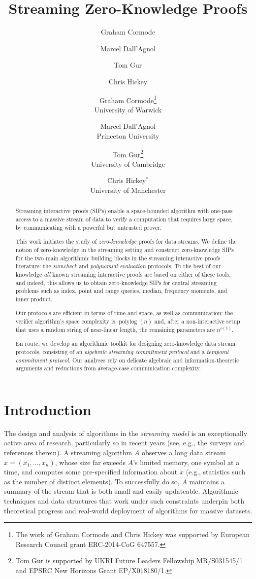 \documentclass[a4paper,UKenglish,cleveref, autoref, thm-restate]{lipics-v2021}
\title{Streaming Zero-Knowledge Proofs}
\author{Graham Cormode}{University of Warwick, UK \and \url{http://dimacs.rutgers.edu/~graham/}}{g.cormode@warwick.ac.uk}{https://orcid.org/0000-0002-0698-0922}{The work of Graham Cormode and Chris Hickey was supported by European Research Council grant ERC-2014-CoG 647557.}
\author{Marcel Dall'Agnol}{Princeton University, USA \and \url{https://marceldallagnol.github.io/}}{dallagnol@princeton.edu}{https://orcid.org/0000-0002-6060-1663}{}
\author{Tom Gur}{University of Cambridge, UK \and \url{https://www.cst.cam.ac.uk/people/tg508}}{tom.gur@cl.cam.ac.uk}{https://orcid.org/0000-0001-7864-7013}{Tom Gur is supported by UKRI Future Leaders Fellowship MR/S031545/1 and EPSRC New Horizons Grant EP/X018180/1.}
\author{Chris Hickey}{University of Manchester, UK}{cjahickey1994@gmail.com}{}{}
\author{Graham Cormode\thanks{The work of Graham Cormode and Chris Hickey was supported by European Research Council grant ERC-2014-CoG 647557.}\\University of Warwick \and Marcel Dall'Agnol\\Princeton University \and Tom Gur\thanks{Tom Gur is supported by UKRI Future Leaders Fellowship MR/S031545/1 and EPSRC New Horizons Grant EP/X018180/1.}\\University of Cambridge \and Chris Hickey$^*$\\University of Manchester}
\theoremstyle{definition}
\newcommand{\polylog}{\operatorname{polylog}}
\begin{document}

\date{}

\maketitle

\begin{abstract}
    Streaming interactive proofs (SIPs) enable a space-bounded algorithm with one-pass access to a massive stream of data to verify a computation that requires large space, by communicating with a powerful but untrusted prover.
    
    This work initiates the study of \emph{zero-knowledge} proofs for data streams. We define the notion of zero-knowledge in the streaming setting and construct zero-knowledge SIPs for the two main algorithmic building blocks in the streaming interactive proofs literature: the \emph{sumcheck} and \emph{polynomial evaluation} protocols. To the best of our knowledge \emph{all} known streaming interactive proofs are based on either of these tools, and indeed, this allows us to obtain zero-knowledge SIPs for central streaming problems such as index, point and range queries, median, frequency moments, and inner product.
    
    Our protocols are efficient in terms of time and space, as well as communication: the verifier algorithm's space complexity is $\polylog(n)$ and, after a non-interactive setup that uses a random string of near-linear length, the remaining parameters are $n^{o(1)}$.
    
    En route, we develop an algorithmic toolkit for designing zero-knowledge data stream protocols, consisting of an \emph{algebraic streaming commitment protocol} and a \emph{temporal commitment protocol}. Our analyses rely on delicate algebraic and information-theoretic arguments and reductions from average-case communication complexity.
\end{abstract}


\newpage
\tableofcontents
\newpage

\section{Introduction}
\label{sec:intro}

The design and analysis of algorithms in the \emph{streaming model} is an exceptionally active area of research, particularly so in recent years (see, e.g., the surveys \cite{M05, M14, C23} and references therein). A streaming algorithm $A$ observes a long data stream $x = (x_1, \ldots, x_n)$, whose size far exceeds $A$'s limited memory, one symbol at a time, and computes some pre-specified information about $x$ (e.g., statistics such as the number of distinct elements). To successfully do so, $A$ maintains a summary of the stream that is both small and easily updateable. Algorithmic techniques and data structures that work under such constraints underpin both theoretical progress and real-world deployment of algorithms for massive datasets.   
\end{document}
